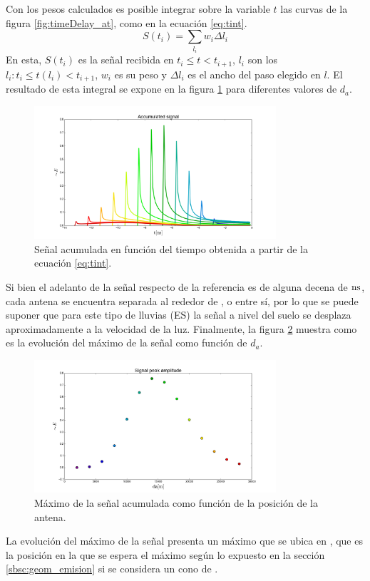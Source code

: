 	Con los pesos calculados es posible integrar sobre la variable $t$ las curvas de la figura \ref{fig:timeDelay_at}, como en la ecuación \ref{eq:tint}.
	\begin{equation}
	S(t_i)=\sum_{l_i}w_i\Delta l_i
	\label{eq:tint}
	\end{equation}
	En esta, $S(t_i)$ es la señal recibida en $t_i\leq t<t_{i+1}$, $l_i$ son los $l_i:t_i\leq t(l_i)<t_{i+1}$, $w_i$ es su peso y $\Delta l_i$ es el ancho del paso elegido en $l$.
	El resultado de esta integral se expone en la figura \ref{fig:timeDelay_as} para diferentes valores de $d_a$.
	\begin{figure}[ht!]
		\centering
		\includegraphics[width=0.8\textwidth]{./fig/EASRadio/timeDelay_as}
		\caption{\label{fig:timeDelay_as}
		Se\~nal acumulada en funci\'on del tiempo obtenida a partir de la ecuación \ref{eq:tint}.
		}
	\end{figure}
	Si bien el adelanto de la señal respecto de la referencia es de alguna decena de $\rm ns$, cada antena se encuentra separada al rededor de , o  entre sí, por lo que se puede suponer que para este tipo de lluvias (ES) la señal a nivel del suelo se desplaza aproximadamente a la velocidad de la luz.
	Finalmente, la figura \ref{fig:timeDelay_spa} muestra como es la evolución del máximo de la señal como función de $d_a$.	
	\begin{figure}[ht!]
		\centering
		\includegraphics[width=0.8\textwidth]{./fig/EASRadio/timeDelay_spa}
		\caption{\label{fig:timeDelay_spa}
		M\'aximo de la se\~nal acumulada como función de la posici\'on de la antena.
		}
	\end{figure}
	La evolución del máximo de la señal presenta un máximo que se ubica en , que es la posición en la que se espera el máximo según lo expuesto en la sección \ref{sbsc:geom_emision} si se considera un cono \cher{} de .
	